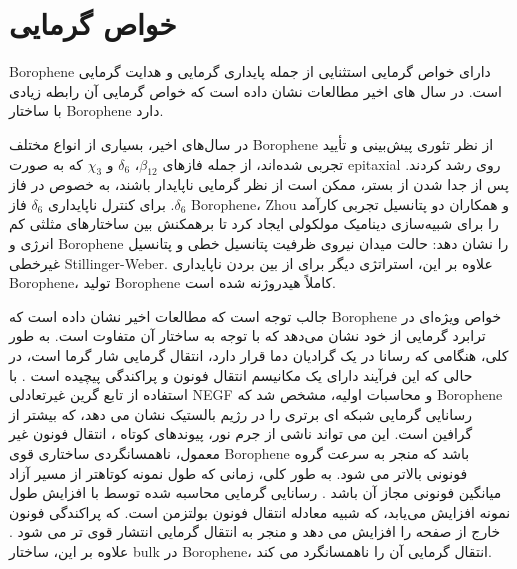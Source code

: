\section{خواص گرمایی}
\gls{Borophene} دارای خواص گرمایی استثنایی از جمله پایداری گرمایی و هدایت گرمایی است. در سال های اخیر مطالعات نشان داده است که خواص گرمایی آن رابطه زیادی با ساختار \gls{Borophene} دارد. 

در سال‌های اخیر، بسیاری از انواع مختلف \gls{Borophene} از نظر تئوری پیش‌بینی و تأیید تجربی شده‌اند، \cite{fengExperimentalRealizationTwodimensional2016, mannixSynthesisBorophenesAnisotropic2015, wuTwoDimensionalBoronMonolayer2012} از جمله فازهای $\beta_{12}$، $\delta_6$ و $\chi_3$ که به صورت \gls{epitaxial} روی  رشد کردند. پس از جدا شدن از بستر، ممکن است از نظر گرمایی ناپایدار باشند، به خصوص در فاز $\delta_6$. برای کنترل ناپایداری $\delta_6$ فاز \gls{Borophene}، \gls{Zhou} و همکاران \cite{zhouMolecularDynamicsSimulations2017} دو پتانسیل تجربی کارآمد را برای شبیه‌سازی دینامیک مولکولی ایجاد کرد تا برهمکنش بین ساختارهای مثلثی کم انرژی و \gls{Borophene} را نشان دهد: حالت میدان نیروی ظرفیت پتانسیل خطی و پتانسیل غیرخطی \gls{Stillinger-Weber}. علاوه بر این، استراتژی دیگر برای از بین بردن ناپایداری \gls{Borophene}، تولید \gls{Borophene} کاملاً هیدروژنه شده است. 

جالب توجه است که مطالعات اخیر نشان داده است که \gls{Borophene} خواص ویژه‌ای در ترابرد گرمایی از خود نشان می‌دهد که با توجه به ساختار آن متفاوت است. به طور کلی، هنگامی که رسانا در یک گرادیان دما قرار دارد، انتقال گرمایی شار گرما است، در حالی که این فرآیند دارای یک مکانیسم انتقال فونون و پراکندگی پیچیده است \cite{li2018review}. با استفاده از تابع گرین غیرتعادلی \gls{NEGF} و محاسبات اولیه، \cite{zhouSuperiorLatticeThermal2017} مشخص شد که \gls{Borophene} رسانایی گرمایی شبکه ای برتری را در رژیم بالستیک نشان می دهد، که بیشتر از گرافین است. این می تواند ناشی از جرم نور، پیوندهای کوتاه ، انتقال فونون غیر معمول، ناهمسانگردی ساختاری قوی \gls{Borophene} باشد که منجر به سرعت گروه فونونی بالاتر می شود. به طور کلی، زمانی که طول نمونه کوتاهتر از مسیر آزاد میانگین فونونی مجاز آن باشد \cite{mortazaviAnomalousStrainEffect2017}. رسانایی گرمایی محاسبه شده توسط  با افزایش طول نمونه افزایش می‌یابد، که شبیه معادله انتقال فونون بولتزمن است. که پراکندگی فونون خارج از صفحه را افزایش می دهد و منجر به انتقال گرمایی انتشار قوی تر می شود \cite{liuRecentProgressGrapheneanalogous2019}. علاوه بر این، ساختار \gls{bulk} در \gls{Borophene}، انتقال گرمایی آن را ناهمسانگرد می کند. 

